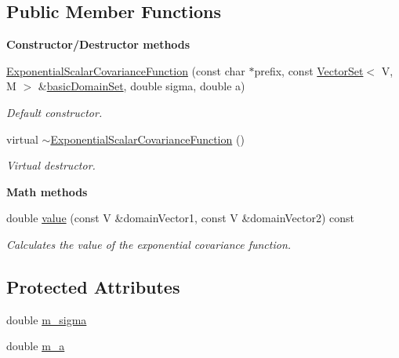 \subsection*{Public Member Functions}
\begin{Indent}{\bf Constructor/\-Destructor methods}\par
\begin{DoxyCompactItemize}
\item 
\hyperlink{class_q_u_e_s_o_1_1_exponential_scalar_covariance_function_a2b0393d92cd21365c2d76d250007ea9a}{Exponential\-Scalar\-Covariance\-Function} (const char $\ast$prefix, const \hyperlink{class_q_u_e_s_o_1_1_vector_set}{Vector\-Set}$<$ V, M $>$ \&\hyperlink{class_q_u_e_s_o_1_1_base_scalar_covariance_function_a703aa6a8e475adaface0ec514b48a5bc}{basic\-Domain\-Set}, double sigma, double a)
\begin{DoxyCompactList}\small\item\em Default constructor. \end{DoxyCompactList}\item 
virtual \hyperlink{class_q_u_e_s_o_1_1_exponential_scalar_covariance_function_ac3eb24d0980491bd3e5bc718d304789c}{$\sim$\-Exponential\-Scalar\-Covariance\-Function} ()
\begin{DoxyCompactList}\small\item\em Virtual destructor. \end{DoxyCompactList}\end{DoxyCompactItemize}
\end{Indent}
\begin{Indent}{\bf Math methods}\par
\begin{DoxyCompactItemize}
\item 
double \hyperlink{class_q_u_e_s_o_1_1_exponential_scalar_covariance_function_ad65cfe1440c9045718bc57827d6fb551}{value} (const V \&domain\-Vector1, const V \&domain\-Vector2) const 
\begin{DoxyCompactList}\small\item\em Calculates the value of the exponential covariance function. \end{DoxyCompactList}\end{DoxyCompactItemize}
\end{Indent}
\subsection*{Protected Attributes}
\begin{DoxyCompactItemize}
\item 
double \hyperlink{class_q_u_e_s_o_1_1_exponential_scalar_covariance_function_aece243cd9fbe9bdd7720b422c2f7513a}{m\-\_\-sigma}
\item 
double \hyperlink{class_q_u_e_s_o_1_1_exponential_scalar_covariance_function_a16940568b7c22abb6caf31ccfb505c16}{m\-\_\-a}
\end{DoxyCompactItemize}



